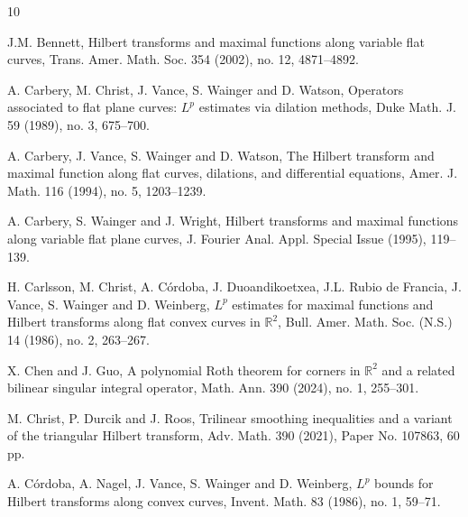 \documentclass[11pt, twoside, leqno]{article}
\theoremstyle{definition}
\numberwithin{equation}{section}
\begin{document}
\begin{thebibliography}{10}

 J.M. Bennett, Hilbert transforms and maximal functions along variable flat curves, Trans. Amer. Math. Soc. 354 (2002), no. 12, 4871--4892.

\vspace{-.3cm}

 A. Carbery, M. Christ, J. Vance, S. Wainger and D. Watson, Operators associated to flat plane curves: $L^p$ estimates via dilation methods, Duke Math. J. 59 (1989), no. 3, 675--700.

\vspace{-.3cm}

 A. Carbery, J. Vance, S. Wainger and D. Watson, The Hilbert transform and maximal function along flat curves, dilations, and differential equations, Amer. J. Math. 116 (1994), no. 5, 1203--1239.

\vspace{-.3cm}

 A. Carbery, S. Wainger and J. Wright, Hilbert transforms and maximal functions along variable flat plane curves, J. Fourier Anal. Appl. Special Issue (1995), 119--139.

\vspace{-.3cm}

 H. Carlsson, M. Christ, A. C\'{o}rdoba, J. Duoandikoetxea, J.L. Rubio de Francia, J. Vance, S. Wainger and D. Weinberg, $L^p$ estimates for maximal functions and Hilbert transforms along flat convex curves in ${\mathbb R}^{2}$, Bull. Amer. Math. Soc. (N.S.) 14 (1986), no. 2, 263--267.

\vspace{-.3cm}

 X. Chen and J. Guo, A polynomial Roth theorem for corners in ${\mathbb R}^{2}$ and a related bilinear singular integral operator, Math. Ann. 390 (2024), no. 1, 255--301.
\vspace{-.3cm}

 M. Christ, P. Durcik and J. Roos, Trilinear smoothing inequalities and a variant of the triangular Hilbert transform, Adv. Math. 390 (2021), Paper No. 107863, 60 pp.

\vspace{-.3cm}

 A. C\'{o}rdoba, A. Nagel, J. Vance, S. Wainger and D. Weinberg, $L^p$ bounds for Hilbert transforms along convex curves, Invent. Math. 83 (1986), no. 1, 59--71.


\end{thebibliography}
\end{document}
